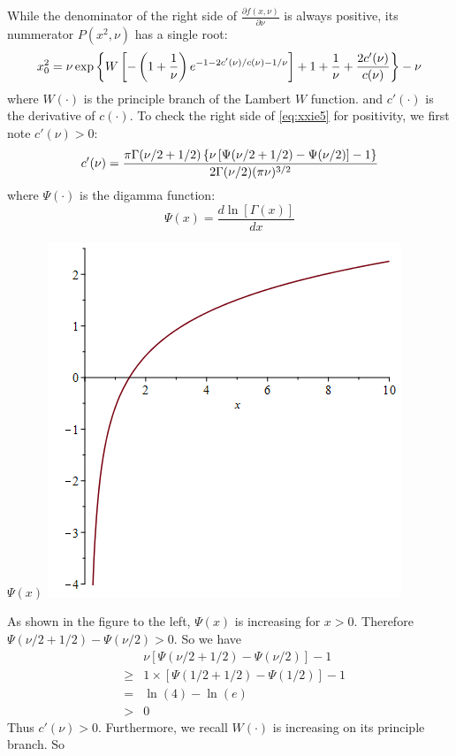 \documentclass{article}
\newcommand{\td}[2]{
  \frac{d #1}{d #2}
}
\newcommand{\pd}[2]{
  \frac{\partial #1}{\partial #2}
}
\newcommand{\1}[1]{
  \mathbf{1}_{\{#1\}}
}
\begin{document}
While the denominator of the right side of $\pd{f(x, \nu)}{\nu}$ is
always positive, its nummerator $P(x^2, \nu)$ has a single root:
\begin{equation}
  \label{eq:xxie5}
  x_0^2 = \nu\exp\left\{
    W\left[
      -\left(1 + {1 \over \nu}\right)
      e^{-1 - 2 c'(\nu)/c(\nu) - 1/\nu}
    \right]
    + 1 + {1 \over \nu} + {2 c'(\nu) \over c(\nu)}
  \right\} - \nu
\end{equation}
where $W(\cdot)$ is the principle branch of the Lambert $W$
function. and $c'(\cdot)$ is the derivative of $c(\cdot)$. To check
the right side of \eqref{eq:xxie5} for positivity, we first note
$c'(\nu) > 0$:
\[
c'(\nu) = {
  \pi \Gamma(\nu/2 + 1/2) \left\{
    \nu \left[ \Psi(\nu/2 + 1/2) - \Psi(\nu/2)\right] - 1
  \right\}
  \over
  2 \Gamma(\nu/2) (\pi \nu)^{3/2}
}
\]
where $\Psi(\cdot)$ is the digamma function:
\[
\Psi(x) = \td{\ln[\Gamma(x)]}{x}
\]
\begin{minipage}{0.48\textwidth}
  $\Psi(x)$ \linebreak
  \includegraphics[width=\textwidth]{digamma.png}
\end{minipage}\hfill
\begin{minipage}{0.5\textwidth}
  As shown in the figure to the left, $\Psi(x)$ is increasing
  for $x > 0$. Therefore $\Psi(\nu/2 + 1/2) - \Psi(\nu/2) > 0$.
  So we have
  \begin{eqnarray*}
    && \nu \left[
    \Psi(\nu/2 + 1/2) - \Psi(\nu/2)
    \right] - 1 \\
    &\geq& 1 \times \left[
    \Psi(1/2 + 1/2) - \Psi(1/2)
    \right] - 1 \\
    &=& \ln(4) - \ln(e) \\
    &>& 0
  \end{eqnarray*}
  Thus $c'(\nu) > 0$. Furthermore, we recall
  $W(\cdot)$ is increasing on its principle branch. So
\end{minipage}
\end{document}
